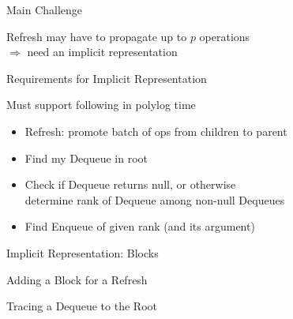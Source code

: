 \documentclass[compress]{beamer}
\newcommand{\Red}[1]{{\color{red}#1}}
\newcommand{\op}[1]{\mbox{\sc #1}}
\begin{document}
\begin{frame}{Main Challenge}

Refresh may have to propagate up to $p$ operations\\
$\Rightarrow$ need an \Red{implicit representation}

\end{frame}

\begin{frame}{Requirements for Implicit Representation}

\only<2>{}%
\only<3>{}%

Must support following in polylog time
\begin{itemize}
\pause
\item Refresh: promote batch of ops from children to parent
\pause
\item Find my \op{Dequeue} in root
\pause
\item Check if \op{Dequeue} returns null, or otherwise\\
determine rank of \op{Dequeue} among non-null \op{Dequeues}
\pause
\item Find \op{Enqueue} of given rank (and its argument)
\end{itemize}

\end{frame}

\begin{frame}{Implicit Representation:  Blocks}

\only<2->{}%

\vfill 

\only<4>{}%

\end{frame}

\begin{frame}{Adding a Block for a Refresh}

\vfill

\end{frame}

\begin{frame}{Tracing a \op{Dequeue} to the Root}

\vfill

\end{frame}
\end{document}

